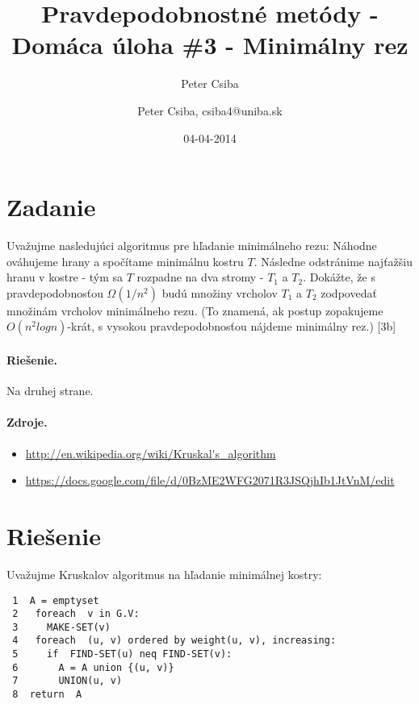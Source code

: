\documentclass[12pt,a4paper]{article}
\author{Peter Csiba}
\title{Pravdepodobnostné metódy - Domáca úloha \#3 - Minimálny rez}
\date{04-04-2014}
\author{Peter Csiba, csiba4@uniba.sk}
\begin{document}
\maketitle

\section*{Zadanie}
Uvažujme nasledujúci algoritmus pre hľadanie minimálneho rezu: Náhodne ováhujeme hrany a spočítame minimálnu kostru $T$. Následne odstránime najťažšiu hranu v kostre - tým sa $T$ rozpadne na dva stromy - $T_1$ a $T_2$. Dokážte, že s pravdepodobnosťou $\Omega(1/n^2)$ budú množiny vrcholov $T_1$ a $T_2$ zodpovedať množinám vrcholov minimálneho rezu. (To znamená, ak postup zopakujeme $O(n^2log n)$-krát, s vysokou pravdepodobnosťou nájdeme minimálny rez.) [3b]

\paragraph{Riešenie.}
Na druhej strane. 

\paragraph{Zdroje.} 
\begin{itemize} 
\item \url{http://en.wikipedia.org/wiki/Kruskal's_algorithm} 
\item \url{https://docs.google.com/file/d/0BzME2WFG2071R3JSQjhIb1JtVnM/edit} 
\end{itemize} 

\newpage
\section*{Riešenie}
Uvažujme Kruskalov algoritmus na hľadanie minimálnej kostry: 

\begin{lstlisting} 
 1  A = emptyset
 2   foreach  v in G.V:
 3     MAKE-SET(v)
 4   foreach  (u, v) ordered by weight(u, v), increasing:
 5     if  FIND-SET(u) neq FIND-SET(v):
 6       A = A union {(u, v)}
 7       UNION(u, v)
 8  return  A
\end{lstlisting}
\end{document}
